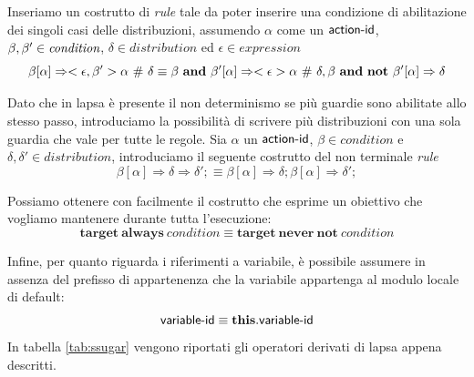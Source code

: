 Inseriamo un costrutto di \emph{rule} tale da poter inserire una condizione di abilitazione dei singoli casi delle distribuzioni, assumendo $\alpha$ come un ${\sf action}\textrm{-}{\sf id}$, $\beta, \beta' \in \emph{condition}$, $\delta \in \mathit{distribution}$ ed $\epsilon \in \mathit{expression}$
$$
\beta [\alpha] \Rightarrow <\epsilon,\beta'> \alpha \mbox{ } \# \mbox{ } \delta
\equiv
\beta \mbox{ } \mathbf{and} \mbox{ } \beta' [\alpha]\Rightarrow <\epsilon> \alpha \mbox{ } \# \mbox{ } \delta,
\beta \mbox{ } \mathbf{and} \mbox{ } \mathbf{not} \mbox{ } \beta' [\alpha]\Rightarrow \delta
$$

Dato che in \ac{lapsa} è presente il non determinismo se più guardie sono abilitate allo stesso passo, introduciamo la possibilità di scrivere più distribuzioni con una sola guardia che vale per tutte le regole. Sia $\alpha$ un ${\sf action}\textrm{-}{\sf id}$, $\beta \in \mathit{condition}$ e $\delta,\delta' \in \mathit{distribution}$, introduciamo il seguente costrutto del non terminale \emph{rule}
$$
\beta [\alpha] \Rightarrow \delta \Rightarrow \delta';
\equiv
\beta [\alpha] \Rightarrow \delta; \beta [\alpha] \Rightarrow \delta'; 
$$

Possiamo ottenere con facilmente il costrutto che esprime un obiettivo che vogliamo mantenere durante tutta l'esecuzione:
$$
	\mathbf{target}\ \mathbf{always}\ \mathit{condition} \equiv \mathbf{target}\ \mathbf{never}\ \mathbf{not}\ \mathit{condition}
$$

Infine, per quanto riguarda i riferimenti a variabile, è possibile assumere in assenza del prefisso di appartenenza che la variabile appartenga al modulo locale di default:
$$
	{\sf variable}\textrm{-}{\sf id} \equiv \mathbf{this}.{\sf variable}\textrm{-}{\sf id}
$$
In tabella \ref{tab:ssugar} vengono riportati gli operatori derivati di \ac{lapsa} appena descritti.


